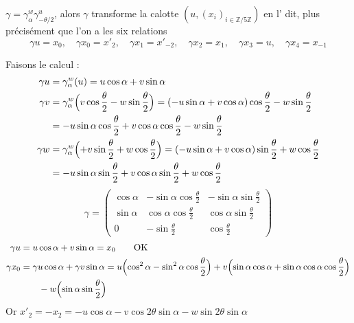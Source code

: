 \documentclass[11pt,a4paper]{article}
\begin{document}
$\gamma = \gamma^{w}_{\alpha} \gamma^{u}_{-\theta/2}$, alors $\gamma$ transforme la calotte $(u, (x_i)_{i \in \mathbb{Z}/5\mathbb{Z}})$ en l'  dit, plus précisément que l'on a les six relations
\[
  \gamma u = x_0 , \quad \gamma x_0 = x'_{2} , \quad \gamma x_1 = x'_{-2} , \quad \gamma x_2 = x_1 , \quad \gamma x_3 = u , \quad \gamma x_4 = x_{-1}
\]

Faisons le calcul :
\begin{align*}
  \gamma u &= \gamma^{w}_{\alpha}(u) = u\cos\alpha + v\sin\alpha \\
  \gamma v &= \gamma^{w}_{\alpha}\Bigl(v\cos\frac{\theta}{2} - w\sin\frac{\theta}{2}\Bigr) = (-u\sin\alpha + v\cos\alpha)\cos\frac{\theta}{2} - w\sin\frac{\theta}{2} \\
  &= -u\sin\alpha\cos\frac{\theta}{2} + v\cos\alpha\cos\frac{\theta}{2} - w\sin\frac{\theta}{2} \\
  \gamma w &= \gamma^{w}_{\alpha}\Bigl(+v\sin\frac{\theta}{2} + w\cos\frac{\theta}{2}\Bigr) = (-u\sin\alpha + v\cos\alpha)\sin\frac{\theta}{2} + w\cos\frac{\theta}{2} \\
  &= -u\sin\alpha\sin\frac{\theta}{2} + v\cos\alpha\sin\frac{\theta}{2} + w\cos\frac{\theta}{2}
\end{align*}
\[
  \gamma = \begin{pmatrix}
    \cos\alpha & -\sin\alpha\cos\frac{\theta}{2} & -\sin\alpha\sin\frac{\theta}{2} \\
    \sin\alpha & \cos\alpha\cos\frac{\theta}{2} & \cos\alpha\sin\frac{\theta}{2} \\
    0 & -\sin\frac{\theta}{2} & \cos\frac{\theta}{2}
  \end{pmatrix}
\]
\begin{align*}
  \gamma u &= u\cos\alpha + v\sin\alpha = x_0 \qquad \text{OK} \\
  \gamma x_0 &= \gamma u \cos\alpha + \gamma v \sin\alpha = u\Bigl(\cos^2\alpha - \sin^2\alpha\cos\frac{\theta}{2}\Bigr) + v\Bigl(\sin\alpha\cos\alpha + \sin\alpha\cos\alpha\cos\frac{\theta}{2}\Bigr) \\
  &\qquad - w\Bigl(\sin\alpha\sin\frac{\theta}{2}\Bigr)
\end{align*}
Or $x'_2 = -x_2 = -u\cos\alpha - v\cos 2\theta\sin\alpha - w\sin 2\theta\sin\alpha$
\end{document}
